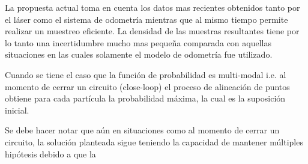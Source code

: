 \documentclass[10pt,a4paper]{article}
\begin{document}
La propuesta actual toma en cuenta los datos mas recientes obtenidos tanto por el láser como el sistema de odometría mientras que al mismo tiempo permite realizar un muestreo eficiente. La densidad de las muestras resultantes tiene por lo tanto una incertidumbre mucho mas pequeña comparada con aquellas situaciones en las cuales solamente el modelo de odometría fue utilizado.

Cuando se tiene el caso que la función de probabilidad es multi-modal i.e. al momento de cerrar un circuito (close-loop) el proceso de alineación de puntos obtiene para cada partícula la probabilidad máxima, la cual es la suposición inicial.

Se debe hacer notar que aún en situaciones como al momento de cerrar un circuito, la solución planteada sigue teniendo la capacidad de mantener múltiples hipótesis debido a que la 
\end{document}
